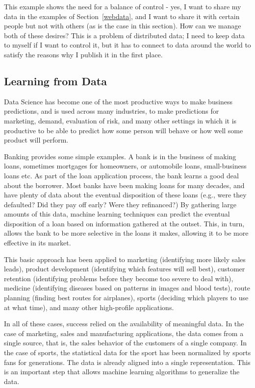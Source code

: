 This example shows the need for a balance of control - yes, I want to share my
data in the examples of Section~\ref{webdata}, and I want to share it with 
certain people but not with others (as is the case in this section). How can
we manage both of these desires?  This is a problem of distributed data; I need
to keep data to myself if I want to control it, but it has to connect to data
around the world to satisfy the reasons why I publish it in the first place. 


\subsection{Learning from Data}

Data Science has become one of the most productive ways to make business predictions,
and is used across many industries, to make predictions for marketing, demand, 
evaluation of risk, and many other settings in which it is productive to be 
able to predict how some person will behave or how well some product will perform. 

Banking provides some simple examples.  A bank is in the business of making loans, 
sometimes mortgages for homeowners, or automobile loans, small-business loans etc. 
As part of the loan application process, the bank learns a good deal about the 
borrower.  Most banks have been making loans for many decades, and have plenty of data
about the eventual disposition of these loans (e.g., were they defaulted?  Did they pay off 
early?  Were they refinanced?) By gathering large amounts of this data, machine learning techniques can 
predict the eventual disposition of a loan based on information gathered at the outset. 
This, in turn, allows the bank to be more selective in the loans it makes, allowing it 
to be more effective in its market. 

This basic approach has been applied to marketing (identifying more likely sales leads), product development
(identifying which features will sell best), customer retention (identifying problems before 
they become too severe to deal with), medicine (identifying diseases based on patterns in 
images and blood tests), route planning (finding best routes for airplanes), sports (deciding which 
players to use at what time), and many other high-profile applications. 

In all of these cases, success relied on the availability of meaningful data.  In the case of marketing, sales and 
manufacturing applications, the data comes from a single source, that is, the sales behavior of the customers 
of a single company.  In the case of sports, the statistical data for the sport has been normalized
by sports fans for generations.  The data is already aligned into a single representation. This is an important
step that allows machine learning algorithms to generalize the data. 

